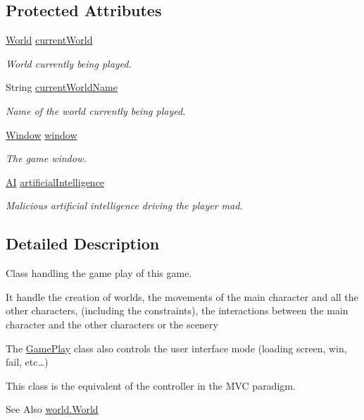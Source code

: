 \subsection*{Protected Attributes}
\begin{DoxyCompactItemize}
\item 
\hyperlink{a00039}{World} \hyperlink{a00010_acac96730473a405274e9ff0a58e4d77e}{current\-World}
\begin{DoxyCompactList}\small\item\em World currently being played. \end{DoxyCompactList}\item 
String \hyperlink{a00010_adcc37bdd0470d8adc27fa249d93adcff}{current\-World\-Name}
\begin{DoxyCompactList}\small\item\em Name of the world currently being played. \end{DoxyCompactList}\item 
\hyperlink{a00037}{Window} \hyperlink{a00010_aed3cc7a8f5e4838bb0b37d4014c6133e}{window}
\begin{DoxyCompactList}\small\item\em The game window. \end{DoxyCompactList}\item 
\hyperlink{a00001}{A\-I} \hyperlink{a00010_a416406c147a47ba292990aa11064d9aa}{artificial\-Intelligence}
\begin{DoxyCompactList}\small\item\em Malicious artificial intelligence driving the player mad. \end{DoxyCompactList}\end{DoxyCompactItemize}


\subsection{Detailed Description}
Class handling the game play of this game. 

It handle the creation of worlds, the movements of the main character and all the other characters, (including the constraints), the interactions between the main character and the other characters or the scenery 

The \hyperlink{a00010}{Game\-Play} class also controls the user interface mode (loading screen, win, fail, etc…) 

This class is the equivalent of the controller in the M\-V\-C paradigm. \begin{DoxySeeAlso}{See Also}
\hyperlink{a00039}{world.\-World} 
\end{DoxySeeAlso}


